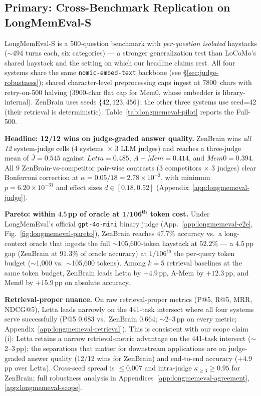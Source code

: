 \documentclass{article}
\begin{document}
\subsection{Primary: Cross-Benchmark Replication on LongMemEval-S}
\label{sec:longmemeval-pilot}

LongMemEval-S \citep{wu2024longmemeval} is a 500-question benchmark
with \emph{per-question isolated} haystacks ($\sim$494 turns each,
six categories) --- a stronger generalization test than LoCoMo's
shared haystack and the setting on which our headline claims rest.
All four systems share the same \texttt{nomic-embed-text} backbone
(see \S\ref{sec:judge-robustness}); shared character-level
preprocessing caps ingest at $7800$~chars with retry-on-500 halving
($3900$-char flat cap for Mem0, whose embedder is
library-internal). ZenBrain uses seeds $\{42,123,456\}$; the other
three systems use seed=42 (their retrieval is deterministic).
Table~\ref{tab:longmemeval-pilot} reports the Full-500.



\textbf{Headline: 12/12 wins on judge-graded answer quality.}
ZenBrain wins \emph{all 12} system-judge cells (4 systems~$\times$
3 LLM judges) and reaches a three-judge mean of
$\bar{J}{=}\mathbf{0.545}$ against $Letta{=}0.485$,
$A-Mem{=}0.414$, and $Mem0{=}0.394$. All 9
ZenBrain-vs-competitor pair-wise contrasts (3 competitors $\times$
3 judges) clear Bonferroni correction at
$\alpha{=}0.05/18{=}2.78\times 10^{-3}$, with minimum
$p{=}6.20\times 10^{-31}$ and effect sizes $d \in [0.18, 0.52]$
(Appendix~\ref{app:longmemeval-judge}).

\textbf{Pareto: within $\mathbf{4.5}$\,pp of oracle at $\mathbf{1/106^\text{th}}$ token cost.}
Under LongMemEval's official \texttt{gpt-4o-mini} binary judge
(App.~\ref{app:longmemeval-e2e}, Fig.~\ref{fig:longmemeval-pareto}),
ZenBrain reaches $\mathbf{47.7\%}$ accuracy vs.\ a long-context oracle
that ingests the full $\sim$105{,}600-token haystack at $\mathbf{52.2\%}$
--- a $\mathbf{4.5}$\,pp gap (ZenBrain at $91.3\%$ of oracle accuracy)
at $1/106^\text{th}$ the per-query token budget ($\sim$1{,}000 vs.\ $\sim$105{,}600 tokens).
Among $k{=}5$ retrieval baselines at the same token budget, ZenBrain
leads Letta by $+4.9$\,pp, A-Mem by $+12.3$\,pp,
and Mem0 by $+15.9$\,pp on absolute accuracy.

\textbf{Retrieval-proper nuance.}
On raw retrieval-proper metrics (P@5, R@5, MRR, NDCG@5),
Letta leads narrowly on the 441-task intersect where all
four systems serve successfully (P@5 $0.683$ vs.\ ZenBrain $0.664$;
$\sim$2--3\,pp on every metric; Appendix~\ref{app:longmemeval-retrieval}).
This is consistent with our scope claim (i): Letta retains
a narrow retrieval-metric advantage on the 441-task intersect ($\sim$2--3\,pp);
the separations that matter for downstream applications are on
judge-graded answer quality (12/12 wins for ZenBrain) and end-to-end
accuracy ($+4.9$\,pp over Letta).
Cross-seed spread is $\leq 0.007$ and intra-judge
$\kappa_{\geq 3}\geq 0.95$ for ZenBrain; full robustness analysis in
Appendices~\ref{app:longmemeval-agreement},
\ref{app:longmemeval-scope}.
\end{document}
